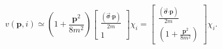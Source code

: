 \begin{equation}
v(\mathbf{p,}i)\simeq \left( 1+\frac{\mathbf{p}^{2}}{8m^{2}}\right) \left[ 
\begin{array}{c}
\frac{(\overrightarrow{\mathbf{\sigma }}\mathbf{\cdot p})}{2m} \\ 
1
\end{array}
\right] \chi _{i}=\left[ 
\begin{array}{c}
\frac{(\overrightarrow{\mathbf{\sigma }}\mathbf{\cdot p})}{2m} \\ 
\left( 1+\frac{\mathbf{p}^{2}}{8m^{2}}\right)
\end{array}
\right] \chi _{i}.
\end{equation}

